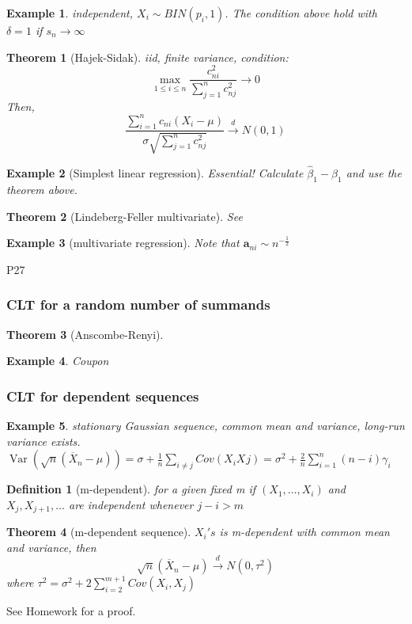 \documentclass{ctexart}
\newtheorem{theorem}{Theorem}[subsection]
\newtheorem{definition}{Definition}[subsection]
\newtheorem{example}{Example}[subsection]
\begin{document}
\begin{example}
  independent, \(X_{i}\sim BIN(p_{i},1)\). The condition above hold with \(\delta=1\) if \(s_{n}\to \infty\)   
\end{example}
\begin{theorem}[Hajek-Sidak]
  iid, finite variance, condition: 
  \[
  \max_{1\le i\le n}\frac{c_{ni}^{2}}{\sum_{j=1}^{n} c_{nj}^{2}}\to 0
  \] 
  Then, 
  \[
  \frac{\sum_{i=1}^{n} c_{ni}(X_{i}-\mu)}{\sigma\sqrt{\sum_{j=1}^{n} c_{nj}^{2}}}\xrightarrow{d}N(0,1)
  \] 
\end{theorem}
  \begin{example}[Simplest linear regression]
    Essential! Calculate \(\hat{\beta}_{1}-\beta_{1}\) and use the theorem above. 
  \end{example}
\begin{theorem}[Lindeberg-Feller multivariate]
  See
\end{theorem}
\begin{example}[multivariate regression]
  Note that \(\boldsymbol{a}_{ni}\sim n^{-\frac{1}{2}}\) 
\end{example}
P27
\subsubsection{CLT for a random number of summands}
\begin{theorem}[Anscombe-Renyi]
  
\end{theorem}
\begin{example}
  Coupon
\end{example}
\subsubsection{CLT for dependent sequences}
\begin{example}
  stationary Gaussian sequence, common mean and variance, long-run variance exists. 
  \(\operatorname{Var}(\sqrt{n}(\overline{X}_{n}-\mu))=\sigma+\frac{1}{n}\sum_{i\neq j}^{} Cov(X_{i}X_{}j)=\sigma^2+\frac{2}{n}\sum_{i=1}^{n} (n-i)\gamma_{i}\)  
\end{example}
\begin{definition}[m-dependent]
  for a given fixed m if \((X_{1},\ldots,X_{i})\) and \(X_{j},X_{j+1},\ldots\) are independent whenever \(j-i>m\)   
\end{definition}
\begin{theorem}[m-dependent sequence]
  \(X_{i}'s\) is m-dependent with common mean and variance, then 
  \[
  \sqrt{n}(\overline{X}_n-\mu)\xrightarrow{d}N(0,\tau^{2})
  \]  
  where \(\tau^{2}=\sigma^{2}+2 \sum_{i=2}^{m+1} Cov(X_{i},X_{j})\) 
\end{theorem}
See Homework for a proof.
\end{document}
